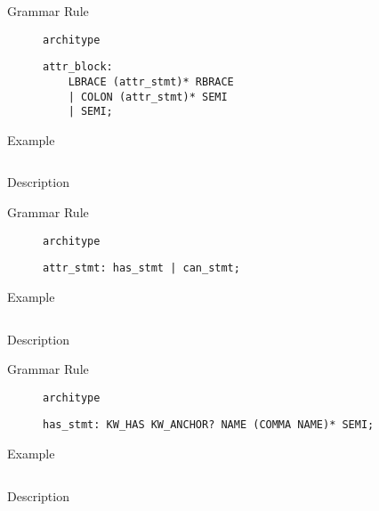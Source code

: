 \begin{description}
    \item[Grammar Rule] \texttt{architype}
          \begin{lstlisting}[style=gram]
attr_block:
    LBRACE (attr_stmt)* RBRACE
    | COLON (attr_stmt)* SEMI
    | SEMI;
        \end{lstlisting}
    \item[Example] \texttt{}
          \begin{lstlisting}
        \end{lstlisting}

    \item[Description]
\end{description}


\begin{description}
    \item[Grammar Rule] \texttt{architype}
          \begin{lstlisting}[style=gram]
attr_stmt: has_stmt | can_stmt;
        \end{lstlisting}
    \item[Example] \texttt{}
          \begin{lstlisting}
        \end{lstlisting}

    \item[Description]
\end{description}


\begin{description}
    \item[Grammar Rule] \texttt{architype}
          \begin{lstlisting}[style=gram]
has_stmt: KW_HAS KW_ANCHOR? NAME (COMMA NAME)* SEMI;
        \end{lstlisting}
    \item[Example] \texttt{}
          \begin{lstlisting}
        \end{lstlisting}

    \item[Description]
\end{description}


